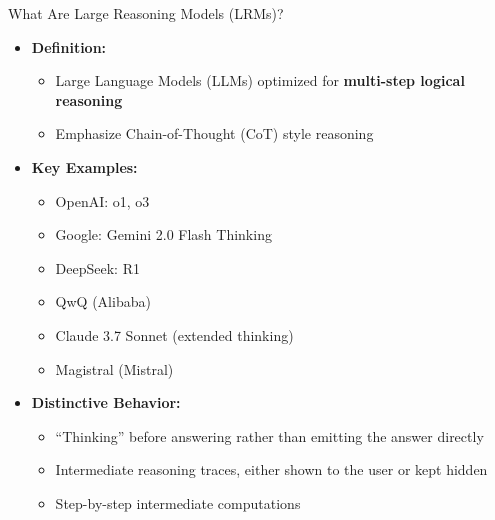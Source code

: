 \begin{frame}[allowframebreaks]{What Are Large Reasoning Models (LRMs)?}
    \begin{itemize}
        \item \textbf{Definition:}
        \begin{itemize}
            \item Large Language Models (LLMs) optimized for \textbf{multi-step logical reasoning}
            \item Emphasize Chain-of-Thought (CoT) style reasoning
        \end{itemize}
        \vspace{1em}
        \item \textbf{Key Examples:}
        \par\vspace{0.3em}
        \begin{minipage}[t]{0.48\linewidth}
            \begin{itemize}
                \item OpenAI: o1, o3
                \item Google: Gemini 2.0 Flash Thinking
                \item DeepSeek: R1
            \end{itemize}
        \end{minipage}\hfill
        \begin{minipage}[t]{0.48\linewidth}
            \begin{itemize}
                \item QwQ (Alibaba)
                \item Claude 3.7 Sonnet (extended thinking)
                \item Magistral (Mistral)
            \end{itemize}
        \end{minipage}
    \framebreak
        \item \textbf{Distinctive Behavior:}
        \begin{itemize}
            \setlength{\itemsep}{0.5em}
            \item ``Thinking'' before answering rather than emitting the answer directly
            \item Intermediate reasoning traces, either shown to the user or kept hidden
            \item Step-by-step intermediate computations

\end{itemize}
\end{itemize}
\end{frame}
